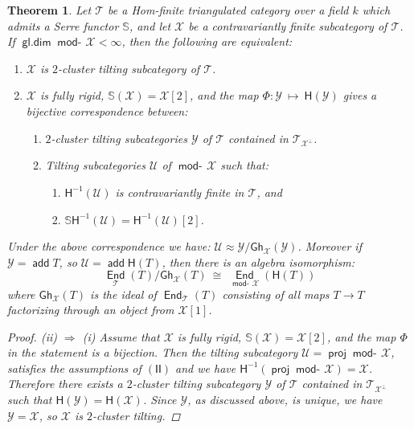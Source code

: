 \documentclass[oneside, a4paper,reqno]{amsart}
\numberwithin{equation}{section}
\newtheorem{thm}{Theorem}[section]
\theoremstyle{definition}
\begin{document}
\begin{thm} Let ${\mathcal T}$ be a Hom-finite triangulated category over a field $k$ which admits a Serre functor $\mathbb S$, and let ${\mathcal X}$ be a contravariantly finite subcategory of ${\mathcal T}$. If $\operatorname*{\mathsf{gl.dim}}\operatorname*{\mathsf{mod}-\!}{\mathcal X} < \infty$, then the following are equivalent:
\begin{enumerate}
\item ${\mathcal X}$ is $2$-cluster tilting subcategory of ${\mathcal T}$.
\item  ${\mathcal X}$ is fully rigid, $\mathbb S({\mathcal X}) = {\mathcal X}[2]$, and the map $\Phi \colon {\mathcal Y} \ \longmapsto \ \mathsf{H}({\mathcal Y})$ gives a bijective correspondence between:
\begin{enumerate}
\item[$\mathsf{(I)}$] $2$-cluster tilting subcategories ${\mathcal Y}$ of ${\mathcal T}$ contained in ${\mathcal T}_{{\mathcal X}^{\bot}}$. 
\item[$\mathsf{(II)}$] Tilting subcategories ${\mathcal U}$ of $\operatorname*{\mathsf{mod}-\!}{\mathcal X}$ such that:
\begin{enumerate}
\item[$\mathrm{(a)}$] $\mathsf{H}^{-1}({\mathcal U})$ is contravariantly finite in ${\mathcal T}$, and 
\item[$\mathrm{(b)}$] $\mathbb S\mathsf{H}^{-1}({\mathcal U}) = \mathsf{H}^{-1}({\mathcal U})[2]$. 
\end{enumerate}
\end{enumerate}
\end{enumerate}  
Under the above correspondence we have: ${\mathcal U} \approx {\mathcal Y}/\mathsf{Gh}_{\mathcal X}({\mathcal Y})$.   Moreover if ${\mathcal Y} = \operatorname*{\mathsf{add}} T$, so ${\mathcal U} =  \operatorname*{\mathsf{add}} \mathsf{H}(T)$, then there is an algebra isomorphism: 
\[
\operatorname*{\mathsf{End}}_{\mathcal T}(T)/\mathsf{Gh}_{\mathcal X}(T) \ \cong \ \operatorname*{\mathsf{End}}_{\operatorname*{\mathsf{mod}-\!}{\mathcal X}}(\mathsf{H}(T))
\] where $\mathsf{Gh}_{\mathcal X}(T)$ is the ideal of $\operatorname*{\mathsf{End}}_{\mathcal T}(T)$ consisting of all maps $T {\longrightarrow} T$ factorizing through an object from ${\mathcal X}[1]$. 
\begin{proof} (ii) $\Longrightarrow$ (i) Assume that ${\mathcal X}$ is fully rigid, $\mathbb S({\mathcal X}) = {\mathcal X}[2]$, and the map $\Phi$ in the statement is a bijection. Then the tilting subcategory ${\mathcal U} = \operatorname*{\mathsf{proj}}\operatorname*{\mathsf{mod}-\!}{\mathcal X}$, satisfies the assumptions of $\mathsf{(II)}$ and we have $\mathsf{H}^{-1}(\operatorname*{\mathsf{proj}}\operatorname*{\mathsf{mod}-\!}{\mathcal X}) = {\mathcal X}$.  Therefore there exists a $2$-cluster tilting subcategory ${\mathcal Y}$ of ${\mathcal T}$ contained in ${\mathcal T}_{{\mathcal X}^{\bot}}$ such that $\mathsf{H}({\mathcal Y}) = \mathsf{H}({\mathcal X})$. Since ${\mathcal Y}$, as discussed above, is unique, we have ${\mathcal Y} = {\mathcal X}$, so ${\mathcal X}$ is $2$-cluster tilting.


\end{proof}
\end{thm}
\end{document}
